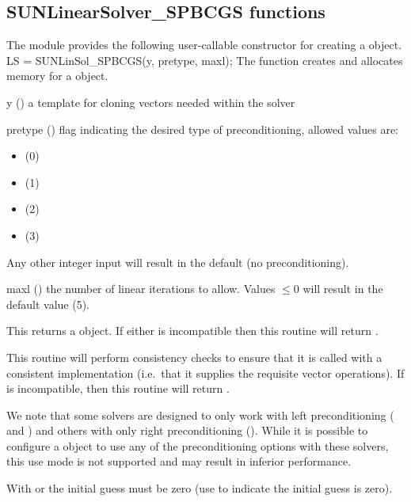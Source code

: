 \subsection{SUNLinearSolver\_SPBCGS functions}
\label{ss:sunlinsol_spbcgs_functions}

The {\sunlinsolspbcgs} module provides the following user-callable constructor
for creating a \newline {} object.
%
%
{
  LS = SUNLinSol\_SPBCGS(y, pretype, maxl);
}
{
  The function  creates and allocates memory for
  a {\spbcgs} \newline {} object.
}
{
  \begin{args}[pretype]
  \item[y] ()
    a template for cloning vectors needed within the solver
  \item[pretype] ()
    flag indicating the desired type of preconditioning, allowed
    values are:
    \begin{itemize}
    \item {} (0)
    \item {} (1)
    \item {} (2)
    \item {} (3)
    \end{itemize}
    Any other integer input will result in the default (no
    preconditioning).
  \item[maxl] ()
    the number of linear iterations to allow. Values $\le0$ will
    result in the default value (5).
  \end{args}
}
{
  This returns a  object.  If either  is
  incompatible then this routine will return .
}
{
  This routine will perform consistency checks to ensure that it is
  called with a consistent {\nvector} implementation (i.e.~that it
  supplies the requisite vector operations).  If  is
  incompatible, then this routine will return .

  We note that some {\sundials} solvers are designed to only work
  with left preconditioning ({\ida} and {\idas}) and others with only
  right preconditioning ({\kinsol}). While it is possible to configure
  a {\sunlinsolspbcgs} object to use any of the preconditioning options
  with these solvers, this use mode is not supported and may result in
  inferior performance.

  With  or  the initial guess must be zero (use
   to indicate the initial guess is zero).
}
